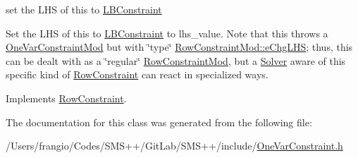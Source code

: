 set the L\+HS of this to \mbox{\hyperlink{class_s_m_spp__di__unipi__it_1_1_l_b_constraint}{L\+B\+Constraint}} 

Set the L\+HS of this to \mbox{\hyperlink{class_s_m_spp__di__unipi__it_1_1_l_b_constraint}{L\+B\+Constraint}} to lhs\+\_\+value. Note that this throws a \mbox{\hyperlink{class_s_m_spp__di__unipi__it_1_1_one_var_constraint_mod}{One\+Var\+Constraint\+Mod}} but with \char`\"{}type\char`\"{} \mbox{\hyperlink{class_s_m_spp__di__unipi__it_1_1_row_constraint_mod_af91e41a206e988d55a31347acd6f5d33a585aad901188269790f584a365b34813}{Row\+Constraint\+Mod\+::e\+Chg\+L\+HS}}; thus, this can be dealt with as a \char`\"{}regular\char`\"{} \mbox{\hyperlink{class_s_m_spp__di__unipi__it_1_1_row_constraint_mod}{Row\+Constraint\+Mod}}, but a \mbox{\hyperlink{class_s_m_spp__di__unipi__it_1_1_solver}{Solver}} aware of this specific kind of \mbox{\hyperlink{class_s_m_spp__di__unipi__it_1_1_row_constraint}{Row\+Constraint}} can react in specialized ways. 

Implements \mbox{\hyperlink{class_s_m_spp__di__unipi__it_1_1_row_constraint_a1e707449bc5e308a84fbb17197e184a6}{Row\+Constraint}}.



The documentation for this class was generated from the following file\+:\begin{DoxyCompactItemize}
\item 
/\+Users/frangio/\+Codes/\+S\+M\+S++/\+Git\+Lab/\+S\+M\+S++/include/\mbox{\hyperlink{_one_var_constraint_8h}{One\+Var\+Constraint.\+h}}\end{DoxyCompactItemize}
